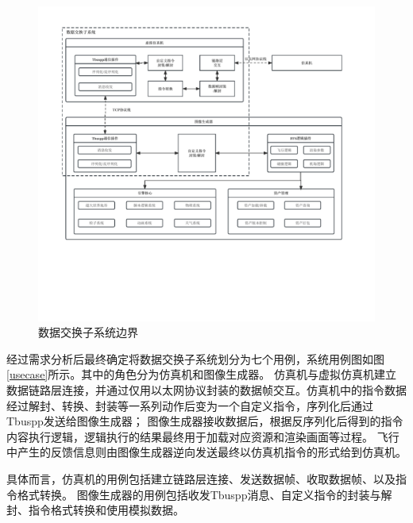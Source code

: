 \begin{figure}[h]
    \begin{center}
        \includegraphics[width=\textwidth]{pictures/sysedge.pdf}
        \caption{数据交换子系统边界}
        \label{sysedge}
    \end{center}
\end{figure}
\par
经过需求分析后最终确定将数据交换子系统划分为七个用例，系统用例图如图\ref{usecase}所示。其中的角色分为仿真机和图像生成器。
仿真机与虚拟仿真机建立数据链路层连接，并通过仅用以太网协议封装的数据帧交互。仿真机中的指令数据经过解封、转换、封装等一系列动作后变为一个自定义指令，序列化后通过Tbuspp发送给图像生成器；
图像生成器接收数据后，根据反序列化后得到的指令内容执行逻辑，逻辑执行的结果最终用于加载对应资源和渲染画面等过程。
飞行中产生的反馈信息则由图像生成器逆向发送最终以仿真机指令的形式给到仿真机。
\par
具体而言，仿真机的用例包括建立链路层连接、发送数据帧、收取数据帧、以及指令格式转换。
图像生成器的用例包括收发Tbuspp消息、自定义指令的封装与解封、指令格式转换和使用模拟数据。



